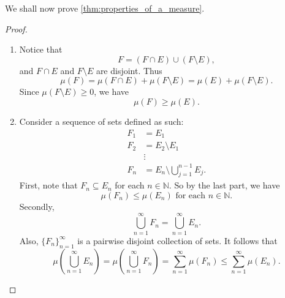 \documentclass[notoc,notitlepage]{tufte-book}
\begin{document}
We shall now prove \cref{thm:properties_of_a_measure}.

\begin{proof}
  \begin{enumerate}
    \item Notice that
      \begin{equation*}
        F = (F \cap E) \cup (F \setminus E),
      \end{equation*}
      and $F \cap E$ and $F \setminus E$ are disjoint.
      Thus
      \begin{equation*}
        \mu(F) = \mu(F \cap E) + \mu(F \setminus E)
             = \mu(E) + \mu(F \setminus E).
      \end{equation*}
      Since $\mu(F \setminus E) \geq 0$, we have
      \begin{equation*}
        \mu(F) \geq \mu(E).
      \end{equation*}

    \item Consider a sequence of sets defined as such:
      \begin{align*}
        F_1 &= E_1 \\
        F_2 &= E_2 \setminus E_1 \\
            &\vdots \\
        F_n &= E_n \setminus \bigcup_{j=1}^{n-1} E_j.
      \end{align*}
      First, note that $F_n \subseteq E_n$ for each $n \in \mathbb{N}$.
      So by the last part, we have
      \begin{equation*}
        \mu(F_n) \leq \mu(E_n) \text{ for each } n \in \mathbb{N}.
      \end{equation*}
      Secondly,
      \begin{equation*}
        \bigcup_{n=1}^{\infty} F_n = \bigcup_{n=1}^{\infty} E_n.
      \end{equation*}
      Also, $\{ F_n \}_{n=1}^{\infty}$ is a pairwise disjoint collection of
      sets.
      It follows that
      \begin{equation*}
        \mu \left( \bigcup_{n=1}^{\infty} E_n \right)
        = \mu \left( \bigcup_{n=1}^{\infty} F_n \right)
        = \sum_{n=1}^{\infty} \mu(F_n)
        \leq \sum_{n=1}^{\infty} \mu(E_n).
      \end{equation*}


\end{enumerate}
\end{proof}
\end{document}

